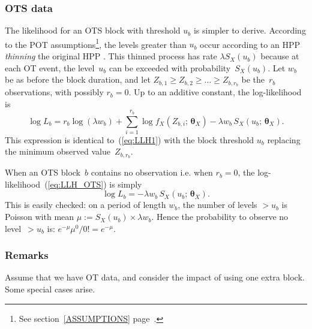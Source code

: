 \documentclass[a4paper]{report}
\newcommand{\bs}{\boldsymbol}
\begin{document}
%

\subsubsection{OTS data}
\label{LOTSdata}
%
The likelihood for an OTS block with threshold $u_{b}$ is simpler
to derive. According to the POT assumptions\footnote{See section~\ref{ASSUMPTIONS}
page~\pageref{ASSUMPTIONS}.}, 
the levels greater than $u_{b}$ occur
according to an HPP \textit{thinning} the 
original HPP%
. 
This thinned process has rate $\lambda S_X(u_{b})$ because at
each OT event, the level~$u_{b}$ can be exceeded with
probability~$S_X(u_{b})$. Let $w_{b}$ be as before the block duration,
and let $Z_{b,1} \geqslant Z_{b,2} \geqslant \dots \geqslant
Z_{b,r_b}$ be the~$r_b$ observations, with possibly $r_b=0$. Up to an
additive constant, the log-likelihood is
\begin{equation}
  \label{eq:LLH_OTS}
  \log L_b  = r_b  \log(\lambda w_{b}) 
    + \sum_{i=1}^{r_b} \log f_X(Z_{b,i};\,\bs{\theta}_X)  
  -\lambda w_{b} \,S_X(u_{b};\,\bs{\theta}_X).
\end{equation}
This expression is identical to~(\ref{eq:LLH1}) with the block
threshold $u_{b}$ replacing the minimum observed value~$Z_{b,r_b}$.

When an OTS block~$b$ contains no observation i.e. when $r_b=0$,
the log-likelihood~(\ref{eq:LLH_OTS}) is simply
\begin{equation}
  \label{eq:LLH2}
     \log L_b =  - \lambda w_{b} \, S_X(u_{b};\,\bs{\theta}_X).
\end{equation}
This is easily checked: on a period of length $w_{b}$, the
number of levels $>u_{b}$ is Poisson with mean $\mu :=
S_X(u_{b}) \times \lambda w_{b}$.  Hence the probability to observe no
level~$>u_{b}$ is: $ e^{-\mu} \mu^0/0!= e^{-\mu}$.  

%


\subsubsection{Remarks}
Assume that we have OT data, and consider the impact of using
one extra block. Some special cases arise.
\end{document}
